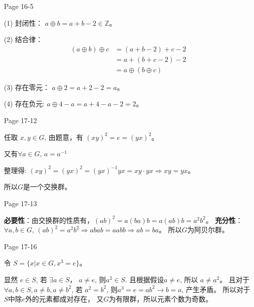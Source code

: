 \documentclass{ximera}
\begin{document}
\begin{problem} Page 16-5
    \begin{solution}
        (1) 封闭性： $a \oplus b = a + b - 2 \in \mathbb{Z} $。

        (2) 结合律： 
            \begin{align}
                (a \oplus b) \oplus c &= (a + b - 2) + c - 2   \\
                    &= a + (b + c - 2) - 2  \\
                    &= a \oplus (b \oplus c)
            \end{align}
        
        (3) 存在零元：
            $ a \oplus 2 = a + 2 - 2 = a$。
        
        (4) 存在负元:
            $ a \oplus 4 - a = a + 4 - a - 2 = 2$。
            

    \end{solution}
\end{problem} 
\begin{problem} Page 17-12
    \begin{solution}
        任取 $x, y \in G$, 由题意，有 $(xy)^2 = e = (yx)^2$。 
        
        又有$\forall a \in G$, $a=a^{-1}$
        
        整理得:
        $(xy)^2=(yx)^2=(yx)^{-1}yx=xy\cdot yx \Rightarrow xy=yx$。
    
        所以$G$是一个交换群。

    \end{solution}
\end{problem}

\begin{problem} Page 17-13
    \begin{solution}
        \textbf{必要性}：由交换群的性质有，$(ab)^2=a(ba)b=a(ab)b=a^2b^2$。
        \textbf{充分性}：$\forall a, b \in G$, $(ab)^2=a^2b^2 \Rightarrow abab=aabb \Rightarrow ab=ba$。
        所以$G$为阿贝尔群。

    \end{solution}
\end{problem}

\begin{problem} Page 17-16
    \begin{solution}
        令 $S=\{ x | x \in G, x^3 = e\}$。
        
        显然 $e \in S$, 若 $\exists a \in S$， $a \not= e$, 则$a^2 \in S$. 且根据假设$a \not= e$, 所以 $a \not= a^2$。
        且对于 $\forall a, b \in S, a \not= b, a \not= b^2$, 若 $a^2=b^2$, 则$a^3=e=ab^2\rightarrow b = a$, 产生矛盾。
        所以对于$S$中除$e$外的元素都成对存在， 又$G$为有限群，所以元素个数为奇数。        
    \end{solution}
\end{problem}
\end{document}
